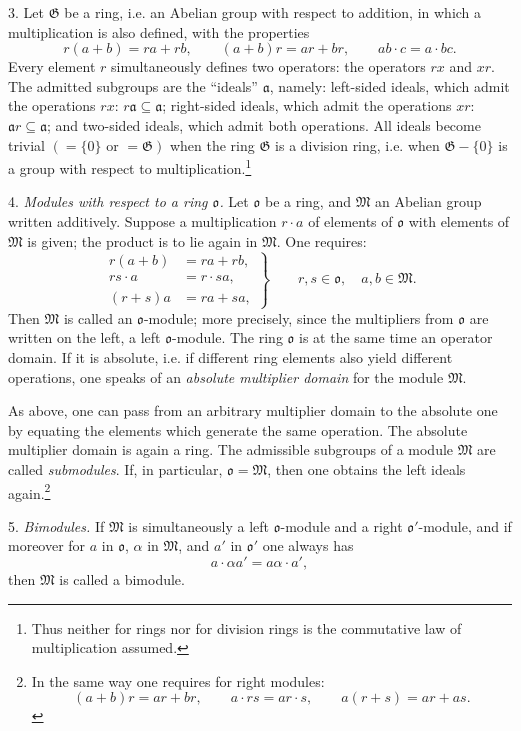 \documentclass[11pt]{article}
\providecommand{\mG}{\mathfrak{G}}
\providecommand{\mM}{\mathfrak{M}}
\providecommand{\mo}{\mathfrak{o}}
\begin{document}
3. Let $\mG$ be a ring, i.e. an Abelian group with respect to addition, in which a multiplication is also defined, with the properties
\[
        r(a+b)=ra+rb,\qquad (a+b)r=ar+br,\qquad ab\cdot c=a\cdot bc.
\]
Every element $r$ simultaneously defines two operators: the operators $rx$ and $xr$. The admitted subgroups are the ``ideals'' $\mathfrak a$, namely: left-sided ideals, which admit the operations $rx$: $r\mathfrak a\subseteq\mathfrak a$; right-sided ideals, which admit the operations $xr$: $\mathfrak a r\subseteq\mathfrak a$; and two-sided ideals, which admit both operations. All ideals become trivial $(=\{0\}\text{ or }=\mG)$ when the ring $\mG$ is a division ring, i.e. when $\mG-\{0\}$ is a group with respect to multiplication.\footnote{Thus neither for rings nor for division rings is the commutative law of multiplication assumed.}

4. \emph{Modules with respect to a ring $\mo$.} Let $\mo$ be a ring, and $\mM$ an Abelian group written additively. Suppose a multiplication $r\cdot a$ of elements of $\mo$ with elements of $\mM$ is given; the product is to lie again in $\mM$. One requires:
\[
\left.
\begin{aligned}
 r(a+b)&=ra+rb,\\
 rs\cdot a&=r\cdot sa,\\
 (r+s)a&=ra+sa,
\end{aligned}
\right\}\qquad r,s\in\mo,\quad a,b\in\mM.
\]
Then $\mM$ is called an $\mo$-module; more precisely, since the multipliers from $\mo$ are written on the left, a left $\mo$-module. The ring $\mo$ is at the same time an operator domain. If it is absolute, i.e. if different ring elements also yield different operations, one speaks of an \emph{absolute multiplier domain} for the module $\mM$.

As above, one can pass from an arbitrary multiplier domain to the absolute one by equating the elements which generate the same operation. The absolute multiplier domain is again a ring. The admissible subgroups of a module $\mM$ are called \emph{submodules}. If, in particular, $\mo=\mM$, then one obtains the left ideals again.\footnote{In the same way one requires for right modules:
\[
(a+b)r=ar+br,\qquad a\cdot rs=ar\cdot s,\qquad a(r+s)=ar+as.
\]}

5. \emph{Bimodules.} If $\mM$ is simultaneously a left $\mo$-module and a right $\mo'$-module, and if moreover for $a$ in $\mo$, $\alpha$ in $\mM$, and $a'$ in $\mo'$ one always has
\[
        a\cdot\alpha a'=a\alpha\cdot a',
\]
then $\mM$ is called a bimodule.
\end{document}
